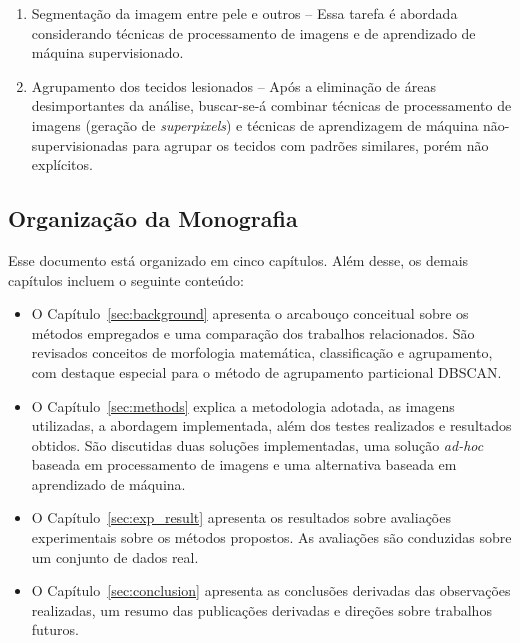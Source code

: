 \begin{enumerate}

\item Segmentação da imagem entre pele e outros -- Essa tarefa é abordada considerando técnicas de processamento de imagens e de aprendizado de máquina supervisionado. 

\item Agrupamento dos tecidos lesionados -- Após a eliminação de áreas desimportantes da análise, buscar-se-á combinar técnicas de processamento de imagens (geração de \textit{superpixels}) e técnicas de aprendizagem de máquina não-supervisionadas para agrupar os tecidos com padrões similares, porém não explícitos.

\end{enumerate}

\subsection{Organização da Monografia}
Esse documento está organizado em cinco capítulos.
Além desse, os demais capítulos incluem o seguinte conteúdo:
\begin{itemize}
    \item O Capítulo~\ref{sec:background} apresenta o arcabouço conceitual sobre os métodos empregados e uma comparação dos trabalhos relacionados.
    São revisados conceitos de morfologia matemática, classificação e agrupamento, com destaque especial para o método de agrupamento particional DBSCAN.
    \item O Capítulo~\ref{sec:methods} explica a metodologia adotada, as imagens utilizadas, a abordagem implementada, além dos testes realizados e resultados obtidos.
    São discutidas duas soluções implementadas, uma solução \textit{ad-hoc} baseada em processamento de imagens e uma alternativa baseada em aprendizado de máquina.
    \item O Capítulo~\ref{sec:exp_result} apresenta os resultados sobre avaliações experimentais sobre os métodos propostos.
    As avaliações são conduzidas sobre um conjunto de dados real.
    \item O Capítulo~\ref{sec:conclusion} apresenta as conclusões derivadas das observações realizadas, um resumo das publicações derivadas e direções sobre trabalhos futuros.
\end{itemize}
